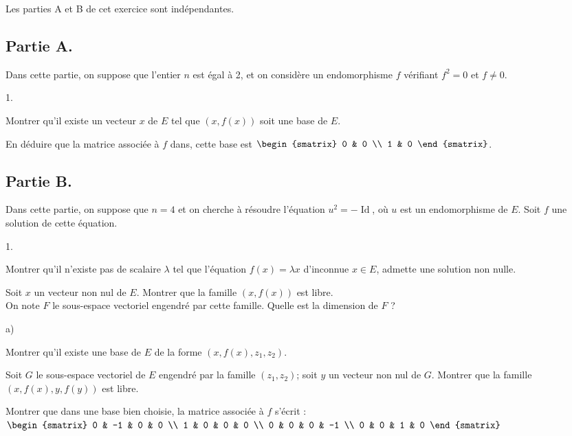 \documentclass[11pt]{article}%
\begin{document}
Les parties A et B de cet exercice sont indépendantes.

\subsection*{Partie A.}

Dans cette partie, on suppose que l'entier $n$ est égal à 2, et on
considère
un endomorphisme $f$ vérifiant $f^{2} = 0$ et $f\neq 0$.

\begin{noliste}{1.}
 \setlength{\itemsep}{4mm}
\item Montrer qu'il existe un vecteur $x$ de $E$ tel que $(x,f(x))$
soit une
base de $E$.

\item En déduire que la matrice associée à $f$ dans, cette base est
$\begin{smatrix}
0 & 0 \\
1 & 0
\end{smatrix}
$.
\end{noliste}

\subsection*{Partie B.}

Dans cette partie, on suppose que $n = 4$ et on cherche à résoudre
l'équation $u^{2} = -\operatorname{Id}$, où $u$ est un endomorphisme de
$E$. Soit $f$ une solution
de cette équation.

\begin{noliste}{1.}
 \setlength{\itemsep}{4mm}
\item Montrer qu'il n'existe pas de scalaire $\lambda $ tel que
l'équation $f(x) = \lambda x$ d'inconnue $x\in E$, admette une solution
non nulle.

\item Soit $x$ un vecteur non nul de $E$. Montrer que la famille
$(x,f(x))$
est libre.\\
On note $F$ le sous-espace vectoriel engendré par cette famille. Quelle
est
la dimension de $F$ ?

\item 

\begin{noliste}{a)}
 \setlength{\itemsep}{2mm}
\item Montrer qu'il existe une base de $E$ de la forme
$(x,f(x),z_{1},z_{2})$.

\item Soit $G$ le sous-espace vectoriel de $E$ engendré par la famille
$(z_{1},z_{2})$; soit $y$ un vecteur non nul de $G$. Montrer que la
famille $(x,f(x),y,f(y))$ est libre.
\end{noliste}

\item Montrer que dans une base bien choisie, la matrice associée à $f$
s'écrit : $\begin{smatrix}
0 & -1 & 0 & 0 \\
1 & 0 & 0 & 0 \\
0 & 0 & 0 & -1 \\
0 & 0 & 1 & 0
\end{smatrix}
$
\end{noliste}
\end{document}
